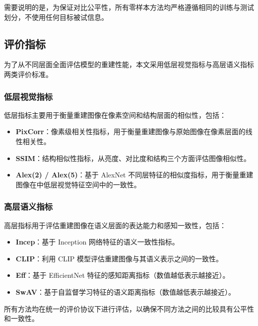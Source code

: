 需要说明的是，为保证对比公平性，所有零样本方法均严格遵循相同的训练与测试划分，不使用任何目标被试信息。

\subsection{评价指标}

为了从不同层面全面评估模型的重建性能，本文采用低层视觉指标与高层语义指标两类评价标准。

\subsubsection{低层视觉指标}

低层指标主要用于衡量重建图像在像素空间和结构层面的相似性，包括：

\begin{itemize}
    \item \textbf{PixCorr}：像素级相关性指标，用于衡量重建图像与原始图像在像素层面的线性相关性。

    \item \textbf{SSIM}：结构相似性指标，从亮度、对比度和结构三个方面评估图像相似性。

    \item \textbf{Alex(2) / Alex(5)}：基于 AlexNet 不同层特征的相似度指标，用于衡量重建图像在中低层视觉特征空间中的一致性。
\end{itemize}

\subsubsection{高层语义指标}

高层指标用于评估重建图像在语义层面的表达能力和感知一致性，包括：

\begin{itemize}
    \item \textbf{Incep}：基于 Inception 网络特征的语义一致性指标。

    \item \textbf{CLIP}：利用 CLIP 模型评估重建图像与其语义表示之间的一致性。

    \item \textbf{Eff}：基于 EfficientNet 特征的感知距离指标（数值越低表示越接近）。

    \item \textbf{SwAV}：基于自监督学习特征的语义距离指标（数值越低表示越接近）。
\end{itemize}

所有方法均在统一的评价协议下进行评估，以确保不同方法之间的比较具有公平性和一致性。


